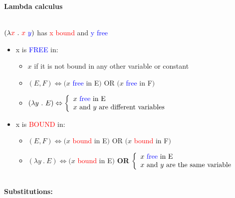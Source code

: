 \documentclass[11pt]{article}
\begin{document}
\begin{center}
\textbf{Lambda calculus}
\end{center}
\\ $(\lambda \textcolor{red}{x}\ .\ \textcolor{red}{x}\ \textcolor{blue}{y})$ has \textcolor{red}{x bound} and \textcolor{blue}{y free}
\begin{itemize}
    \item x is \textcolor{blue}{FREE} in:
    \begin{itemize}
        \item $x$ if it is not bound in any other variable or constant
        \item $(E,F) \Leftrightarrow (x$ \textcolor{blue}{free} in E$)$ OR $(x$ \textcolor{blue}{free} in F$)$
        \item $(\lambda y\ .\ E) \Leftrightarrow 
            \left\{
                \begin{array}{ll}
                    x \mbox{ \textcolor{blue}{free} in E} \\
                    x \mbox{ and } y \mbox{ are different variables}
                \end{array}
            \right.$
    \end{itemize}
    \item x is \textcolor{red}{BOUND} in:
    \begin{itemize}
        \item $(E,F) \Leftrightarrow (x$ \textcolor{red}{bound} in E$)$ OR $(x$ \textcolor{red}{bound} in F$)$
        \item $(\lambda y\ .\ E) \Leftrightarrow (x$ \textcolor{red}{bound} in E$)$ \textbf{OR} 
            $\left\{
                \begin{array}{ll}
                    x \mbox{ \textcolor{blue}{free} in E} \\
                    x \mbox{ and } y \mbox{ are the same variable}
                \end{array}
            \right.$
    \end{itemize}
\end{itemize}
\\ \textbf{Substitutions:}
\end{document}
